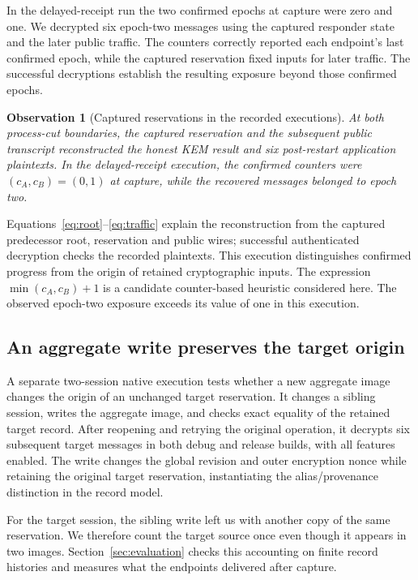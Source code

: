 \documentclass[pdflatex]{sn-jnl}
\theoremstyle{thmstyleone}
\theoremstyle{thmstylethree}
\theoremstyle{thmstyletwo}
\newtheorem{observation}[theorem]{Observation}
\begin{document}
In the delayed-receipt run the two confirmed epochs at capture were
zero and one. We decrypted six epoch-two messages using the captured
responder state and the later public traffic. The counters correctly
reported each endpoint's last confirmed epoch, while the captured
reservation fixed inputs for later traffic. The successful decryptions
establish the resulting exposure beyond those confirmed epochs.

\begin{observation}[Captured reservations in the recorded executions]
\label{prop:counter-separation}
At both process-cut boundaries, the captured reservation and the subsequent
public transcript reconstructed the honest KEM result and six post-restart
application plaintexts. In the delayed-receipt execution, the confirmed
counters were $(c_A,c_B)=(0,1)$ at capture, while the recovered messages
belonged to epoch two.
\end{observation}

Equations~\eqref{eq:root}--\eqref{eq:traffic} explain the reconstruction
from the captured predecessor root, reservation and public wires; successful
authenticated decryption checks the recorded plaintexts. This execution
distinguishes confirmed progress from the origin of retained cryptographic
inputs. The expression $\min(c_A,c_B)+1$ is a candidate counter-based
heuristic considered here. The observed epoch-two exposure exceeds its
value of one in this execution.

\subsection{An aggregate write preserves the target origin}

A separate two-session native execution tests whether a new aggregate
image changes the origin of an unchanged target reservation. It changes a
sibling session, writes the aggregate image, and checks exact equality of
the retained target record. After reopening and retrying the original
operation, it decrypts six subsequent target messages in both debug and
release builds, with all features enabled. The write changes the global
revision and outer encryption nonce while retaining the original target
reservation, instantiating the alias/provenance distinction in the record model.

For the target session, the sibling write left us with another copy of the
same reservation. We therefore count the target source once even though it
appears in two images. Section~\ref{sec:evaluation} checks this accounting
on finite record histories and measures what the endpoints delivered after
capture.
\end{document}
